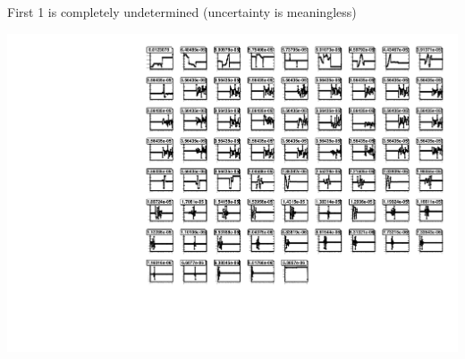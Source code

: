 \documentclass[compress]{beamer}
\begin{document}
\begin{frame}
{First 1 is completely undetermined (uncertainty is meaningless)

\includegraphics[width=0.9\linewidth]{newplots_errors_YEp1_x.pdf}}
\end{frame}
\end{document}

